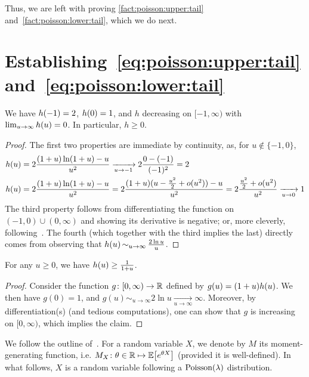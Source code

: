 \documentclass[10pt]{article}
\newcommand{\bennettfunc}{h}
\newcommand{\bennett}[1]{\bennettfunc\mleft(#1\mright)}
\begin{document}
\noindent Thus, we are left with proving \autoref{fact:poisson:upper:tail} and~\autoref{fact:poisson:lower:tail}, which we do next.

\section{Establishing~\eqref{eq:poisson:upper:tail} and~\eqref{eq:poisson:lower:tail}}

\begin{fact}\label{fact:bennett:function}
  We have $\bennett{-1}=2$, $\bennett{0}=1$, and $\bennettfunc$ decreasing on $[-1,\infty)$ with $\lim_{u\to\infty} \bennett{u}=0$. In particular, $\bennettfunc\geq 0$.
\end{fact}
\begin{proof}
  The first two properties are immediate by continuity, as, for $u\notin\{-1,0\}$,
  \begin{align*}
      \bennett{u} &= 2\frac{(1+u)\ln(1+u)-u}{u^2} \xrightarrow[u\to-1]{} 2\frac{0-(-1)}{(-1)^2} = 2 \\
      \bennett{u} &= 2\frac{(1+u)\ln(1+u)-u}{u^2} = 2\frac{(1+u)(u-\frac{u^2}{2}+o(u^2))-u}{u^2}
                 = 2\frac{\frac{u^2}{2}+o(u^2)}{u^2} \xrightarrow[u\to0]{} 1
  \end{align*}
  The third property follows from differentiating the function on $(-1,0)\cup(0,\infty)$ and showing its derivative is negative; or, more cleverly, following~\cite[Exercise 14, (ii)]{Pollard:15}. The fourth (which together with the third implies the last) directly comes from observing that $\bennett{u} \operatorname*{\sim}_{u\to\infty} \frac{2\ln u}{u}$.
\end{proof}

\begin{fact}\label{fact:bennett:function:ii}
  For any $u\geq 0$, we have $\bennett{u} \geq \frac{1}{1+u}$.
\end{fact}
\begin{proof}
  Consider the function $g\colon [0,\infty) \to \mathbb{R}$ defined by $g(u) = (1+u)\bennett{u}$. We then have $g(0)=1$, and $g(u) \operatorname*{\sim}_{u\to\infty} 2\ln u \xrightarrow[u\to\infty]{} \infty$. Moreover, by differentiation(s) (and tedious computations), one can show that $g$ is increasing on $[0,\infty)$, which implies the claim.
\end{proof}

We follow the outline of~\cite[Exercise 15]{Pollard:15}. For a random variable $X$, we denote by $M$ its moment-generating function, i.e. $M_X\colon \theta\in\mathbb{R} \mapsto \mathbb{E}\!\left[e^{\theta X}\right]$ (provided it is well-defined). In what follows, $X$ is a random variable following a $\operatorname{Poisson}\!\left( \lambda \right) $ distribution.
\end{document}
